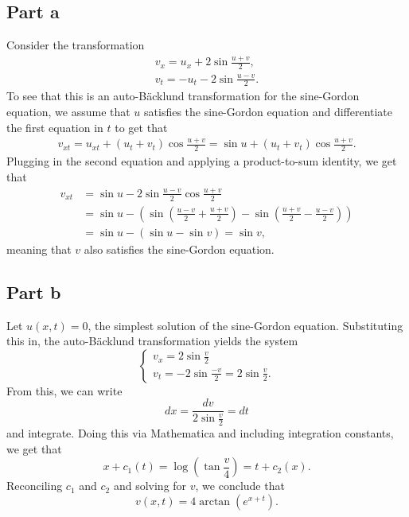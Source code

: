 \documentclass{article}
\begin{document}
\subsection{Part a}
Consider the transformation
\begin{align*}
	v_x=u_x+2\sin \frac{u+v}{2},\\
	v_t=-u_t-2\sin \frac{u-v}{2}.
\end{align*}
To see that this is an auto-B\"acklund transformation for the sine-Gordon equation, we assume that $u$ satisfies the sine-Gordon equation and differentiate the first equation in $t$ to get that 
\begin{align*}
v_{xt}=u_{xt}+(u_t+v_t)\cos\frac{u+v}{2}=\sin u+(u_t+v_t)\cos\frac{u+v}{2}.
\end{align*}
Plugging in the second equation and applying a product-to-sum identity, we get that 
\begin{align*}
v_{xt}&=\sin u-2\sin\frac{u-v}{2}\cos\frac{u+v}{2}\\&=
\sin u-\left(\sin\left(\frac{u-v}{2}+\frac{u+v}{2}\right)-\sin\left(\frac{u+v}{2}-\frac{u-v}{2}\right)\right)\\&=
\sin u-(\sin u-\sin v)=\sin v,
\end{align*}
meaning that $v$ also satisfies the sine-Gordon equation.

\subsection{Part b}
Let $u(x,t)=0$, the simplest solution of the sine-Gordon equation. Substituting this in, the auto-B\"acklund transformation yields the system
\[
\begin{cases}
	v_x=2\sin\frac{v}{2}\\
	v_t=-2\sin\frac{-v}{2}=2\sin\frac{v}{2}.
\end{cases}
\]
From this, we can write
\[
dx=\frac{dv}{2\sin\frac{v}{2}}=dt
\]
and integrate. Doing this via Mathematica and including integration constants, we get that
\[
x+c_1(t)=\log\left(\tan\frac{v}{4}\right)=t+c_2(x).
\]
Reconciling $c_1$ and $c_2$ and solving for $v$, we conclude that
\[
v(x,t)=4\arctan\left(e^{x+t}\right).
\]
\end{document}
